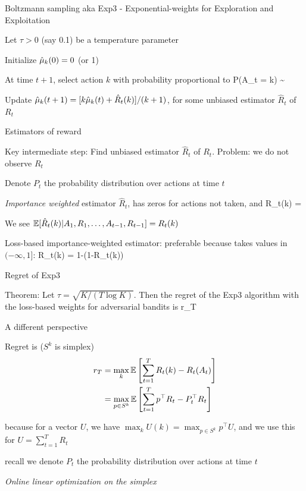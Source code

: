\documentclass[english]{article}
\begin{document}
\item {Boltzmann sampling aka Exp3 -  Exponential-weights for Exploration and Exploitation}
\bitem 
\item Let $\tau>0$ (say 0.1) be a temperature parameter
\benum
\item Initialize $\hat{\mu}_k(0)=0$ (or 1)
\item At time $t+1$, select action $k$ with probability proportional to 
\beqs P(A_t = k) \sim \exp{}\eeqs
\item Update $\hat{\mu}_k(t+1) = [k\hat{\mu}_k(t)+ \hat R_t(k)]/(k+1)$, for some unbiased estimator $\hat R_t$ of $R_t$
\eenum
\eitem





\item {Estimators of reward}
\bitem
\item Key intermediate step: Find unbiased estimator $\hat R_t$ of $R_t$. Problem: we do not observe $R_t$
\item Denote $P_t$ the probability distribution over actions at time $t$
\item \emph{Importance weighted} estimator $\hat R_t$, has zeros for actions not taken, and
\beqs
\hat R_t(k) = 
\eeqs
\item We see $\mathbb{E}[\hat R_t(k)|A_1,R_1,\ldots,A_{t-1},R_{t-1}] =R_t(k)$
\item Loss-based importance-weighted
estimator: preferable because takes values in $(-\infty,1]$: 
\beqs
\hat R_t(k) = 1-(1-R_t(k))
\eeqs
\eitem




\item {Regret of Exp3}
\bitem 
\item Theorem: Let $\tau = \sqrt{K/(T\log K)}$. Then the regret of the Exp3 algorithm with the loss-based weights for adversarial bandits is
\beqs
 r_T \le {}
\eeqs
\eitem




\item {A different perspective}
\bitem
\item  Regret is ($S^k$ is simplex)
\begin{align*}
r_T & = \max_k \mathbb{E}\left[\sum_{t=1}^T R_{t}(k) - R_t(A_t)\right]\\
& = \max_{p\in S^k} \mathbb{E}\left[\sum_{t=1}^T p^\top R_{t} -P_t^\top R_{t}\right]
\end{align*}
\item because for a vector $U$, we have  $\max_k U(k) = \max_{p\in S^k} p^\top U$, and we use this for $U=\sum_{t=1}^T R_{t}$
\item recall we denote $P_t$ the probability distribution over actions at time $t$
\item \emph{Online linear optimization on the simplex}
\eitem
\end{document}
